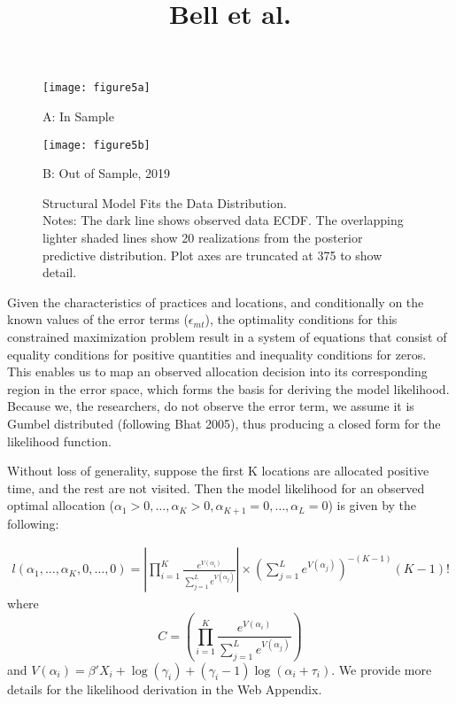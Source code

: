 \documentclass{article}
\begin{document}
\title{Bell et al.}
\author{}
\date{}
\maketitle

\begin{figure}[h]
\centering
\begin{minipage}{0.48\textwidth}
\centering
\texttt{[image: figure5a]}
\caption{A: In Sample}
\end{minipage}
\hfill
\begin{minipage}{0.48\textwidth}
\centering
\texttt{[image: figure5b]}
\caption{B: Out of Sample, 2019}
\end{minipage}
\caption{Structural Model Fits the Data Distribution. \\ Notes: The dark line shows observed data ECDF. The overlapping lighter shaded lines show 20 realizations from the posterior predictive distribution. Plot axes are truncated at 375 to show detail.}
\label{fig:structural_model}
\end{figure}

Given the characteristics of practices and locations, and conditionally on the known values of the error terms ($\epsilon_{mt}$), the optimality conditions for this constrained maximization problem result in a system of equations that consist of equality conditions for positive quantities and inequality conditions for zeros. This enables us to map an observed allocation decision into its corresponding region in the error space, which forms the basis for deriving the model likelihood. Because we, the researchers, do not observe the error term, we assume it is Gumbel distributed (following Bhat 2005), thus producing a closed form for the likelihood function.

Without loss of generality, suppose the first K locations are allocated positive time, and the rest are not visited. Then the model likelihood for an observed optimal allocation ($\alpha_1 > 0, \dots, \alpha_K > 0, \alpha_{K+1} = 0, \dots, \alpha_L = 0$) is given by the following:

\begin{align} \label{eq:1}
l(\alpha_1, \dots, \alpha_K, 0, \dots, 0) = \left| \prod_{i=1}^K \frac{e^{V(\alpha_i)}}{\sum_{j=1}^L e^{V(\alpha_j)}} \right| \times \left( \sum_{j=1}^L e^{V(\alpha_j)} \right)^{-(K-1)} (K-1)!
\end{align}
where
\[ C = \left( \prod_{i=1}^K \frac{e^{V(\alpha_i)}}{\sum_{j=1}^L e^{V(\alpha_j)}} \right) \]
and $V(\alpha_i) = \beta'X_i + \log(\gamma_i) + (\gamma_i - 1) \log(\alpha_i + \tau_i)$. We provide more details for the likelihood derivation in the Web Appendix.
\end{document}
